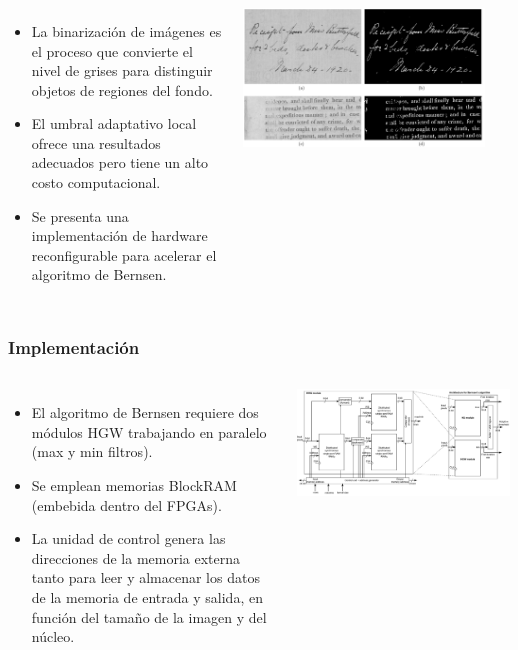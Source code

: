 \frame
{
\frametitle{}
\begin{columns}
\begin{itemize}
\item La binarización de imágenes es el proceso que convierte el nivel de grises
para distinguir objetos de regiones del fondo.
\item El umbral adaptativo local ofrece una resultados adecuados pero tiene un alto costo computacional. 
\item Se presenta una implementación de hardware reconfigurable para acelerar el algoritmo de Bernsen.
\end{itemize}
    \includegraphics[width=0.9\textwidth]{Figs/2014_Arq_Umbralizacion02}
\end{columns}

}

\frame
{
\frametitle{Implementación}
\begin{columns}
\begin{itemize}
\item El algoritmo de Bernsen requiere dos módulos HGW trabajando en paralelo (max y min filtros).
\item Se emplean memorias BlockRAM (embebida dentro del FPGAs). 
\item La unidad de control genera las direcciones de la memoria externa tanto para leer y almacenar los datos de la memoria de entrada y salida, en función del tamaño de la imagen y del núcleo.
\end{itemize}
\begin{center}
    \includegraphics[width=0.99\textwidth]{Figs/2014_Arq_Umbralizacion01}
\end{center}    
\end{columns}
}


